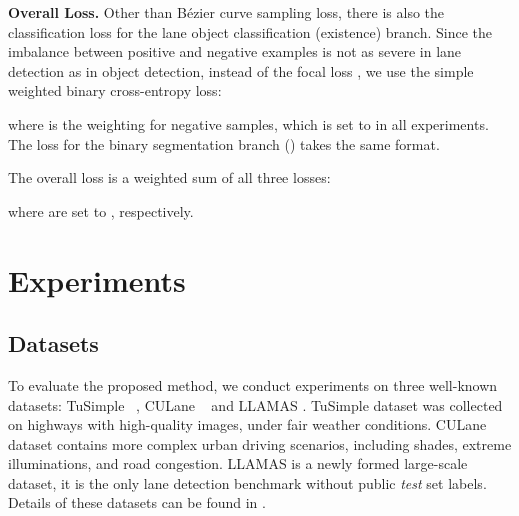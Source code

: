 \documentclass[10pt,twocolumn,letterpaper]{article}
\begin{document}
\noindent \textbf{Overall Loss.} Other than Bézier curve sampling loss, there is also the classification loss  for the lane object classification (existence) branch. Since the imbalance between positive and negative examples is not as severe in lane detection as in object detection, instead of the focal loss \cite{lin2017focal}, we use the simple weighted binary cross-entropy loss:

\vspace{-5mm}


where  is the weighting for negative samples, which is set to  in all experiments.
The loss  for the binary segmentation branch () takes the same format.

The overall loss is a weighted sum of all three losses:

\vspace{-5mm}


where  are set to , respectively.

\section{Experiments}
\label{sec:exper}

\subsection{Datasets}
\label{sec:dataset}
To evaluate the proposed method, we conduct experiments on three well-known datasets: TuSimple ~\cite{tusimple}, CULane ~\cite{pan2018spatial} and LLAMAS \cite{llamas2019}.
TuSimple dataset was collected on highways with high-quality images, under fair weather conditions.
CULane dataset contains more complex urban driving scenarios, including shades, extreme illuminations, and road congestion.
LLAMAS is a newly formed large-scale dataset, it is the only lane detection benchmark without public \textit{test} set labels.
Details of these datasets can be found in .

\begin{table}[t]
\begin{center}
\end{center}
\vspace{-5mm}
\caption{Details of datasets. *Number of lines in LLAMAS dataset is more than 4, but official metric only evaluates 4 lines.}
\label{tab: datasets}
\vspace{-3mm}
\end{table}
\end{document}
